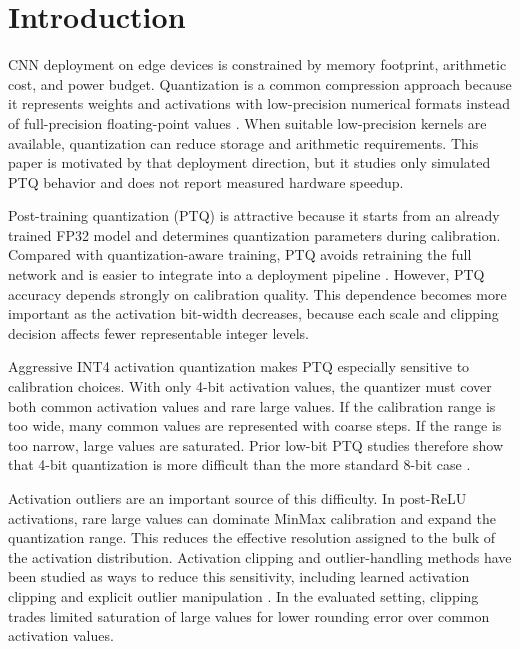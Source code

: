 
\section{Introduction}
\label{sec:introduction}

CNN deployment on edge devices is constrained by memory footprint, arithmetic cost, and power budget. Quantization is a common compression approach because it represents weights and activations with low-precision numerical formats instead of full-precision floating-point values \cite{gholami2021survey,nagel2021whitepaper,krishnamoorthi2018quantizing}. When suitable low-precision kernels are available, quantization can reduce storage and arithmetic requirements. This paper is motivated by that deployment direction, but it studies only simulated PTQ behavior and does not report measured hardware speedup.

Post-training quantization (PTQ) is attractive because it starts from an already trained FP32 model and determines quantization parameters during calibration. Compared with quantization-aware training, PTQ avoids retraining the full network and is easier to integrate into a deployment pipeline \cite{nagel2021whitepaper}. However, PTQ accuracy depends strongly on calibration quality. This dependence becomes more important as the activation bit-width decreases, because each scale and clipping decision affects fewer representable integer levels.

Aggressive INT4 activation quantization makes PTQ especially sensitive to calibration choices. With only 4-bit activation values, the quantizer must cover both common activation values and rare large values. If the calibration range is too wide, many common values are represented with coarse steps. If the range is too narrow, large values are saturated. Prior low-bit PTQ studies therefore show that 4-bit quantization is more difficult than the more standard 8-bit case \cite{banner2018post,choukroun2019low,nahshan2019loss}.

Activation outliers are an important source of this difficulty. In post-ReLU activations, rare large values can dominate MinMax calibration and expand the quantization range. This reduces the effective resolution assigned to the bulk of the activation distribution. Activation clipping and outlier-handling methods have been studied as ways to reduce this sensitivity, including learned activation clipping and explicit outlier manipulation \cite{choi2018pact,zhao2019outlier,xiao2022smoothquant}. In the evaluated setting, clipping trades limited saturation of large values for lower rounding error over common activation values.


